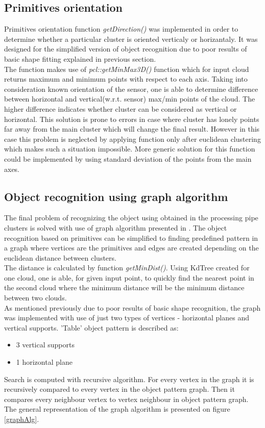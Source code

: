 \documentclass[fontsize=12pt]{article}
\begin{document}
\subsection{Primitives orientation}
Primitives orientation function \emph{getDirection()} was implemented in order to determine whether a particular cluster is oriented verticaly or horizantaly. It was designed for the simplified version of object recognition due to poor results of basic shape fitting explained in previous section.\\\newline
\indent The function makes use of \emph{pcl::getMinMax3D()} function which for input cloud returns maximum and minimum points with respect to each axis. Taking into consideration known orientation of the sensor, one is able to determine difference between horizontal and vertical(w.r.t. sensor) max/min points of the cloud. The higher difference indicates whether cluster can be considered as vertical or horizontal. This solution is prone to errors in case where cluster has lonely points far away from the main cluster which will change the final result. However in this case this problem is neglected by applying function only after euclidean clustering which makes such a situation impossible. More generic solution for this function could be implemented by using standard deviation of the points from the main axes.

\subsection{Object recognition using graph algorithm}
The final problem of recognizing the object using obtained in the processing pipe clusters is solved with use of graph algorithm presented in \cite{graph}. The object recognition based on primitives can be simplified to finding predefined pattern in a graph where vertices are the primitives and edges are created depending on the euclidean distance between clusters.\\ \newline
\indent The distance is calculated by function \emph{getMinDist()}. Using KdTree created for one cloud, one is able, for given input point, to quickly find the nearest point in the second cloud where the minimum distance will be the minimum distance between two clouds.\\\newline
\indent As mentioned previously due to poor results of basic shape recognition, the graph was implemented with use of just two types of vertices - horizontal planes and vertical supports. 'Table' object pattern is described as:
\begin{itemize}
  \item 3 vertical supports
  \item 1 horizontal plane
\end{itemize}
Search is computed with recursive algorithm. For every vertex in the graph it is recursively compared to every vertex in the object pattern graph. 
Then it compares every neighbour vertex to vertex neighbour in object pattern graph. The general representation of the graph algorithm is presented on figure \ref{graphAlg}.
\end{document}

